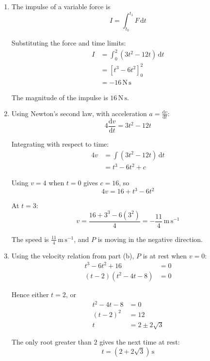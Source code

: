 \documentclass[leqno]{article}
\begin{document}
\begin{enumerate}[
  label=\textbf{\arabic*.},
  leftmargin=*,
  topsep=0pt,
  partopsep=0pt,
  parsep=0pt
]
\vspace*{10pt}

\begin{djsSolution}
\begin{enumerate}[label=\textbf{(\alph*)}, start=1]
\item The impulse of a variable force is
\[
I=\int_{t_0}^{t_1}F\,\mathrm{d}t
\]

Substituting the force and time limits:
\begin{align*}
I&=\int_0^2(3t^2-12t)\,\mathrm{d}t\\
&=\left[t^3-6t^2\right]_0^2\\
&=-16\,\mathrm{N\,s}
\end{align*}

The magnitude of the impulse is \(16\,\mathrm{N\,s}\).

\item Using Newton's second law, with acceleration \(a=\frac{\mathrm{d}v}{\mathrm{d}t}\):
\[
4\frac{\mathrm{d}v}{\mathrm{d}t}=3t^2-12t
\]

Integrating with respect to time:
\begin{align*}
4v&=\int(3t^2-12t)\,\mathrm{d}t\\
&=t^3-6t^2+c
\end{align*}

Using \(v=4\) when \(t=0\) gives \(c=16\), so
\[
4v=16+t^3-6t^2
\]

At \(t=3\):
\[
v=\dfrac{16+3^3-6(3^2)}{4}=-\dfrac{11}{4}\,\mathrm{m\,s^{-1}}
\]

The speed is \(\frac{11}{4}\,\mathrm{m\,s^{-1}}\), and \(P\) is moving in the negative direction.

\item Using the velocity relation from part (b), \(P\) is at rest when \(v=0\):
\begin{align*}
t^3-6t^2+16&=0\\
(t-2)(t^2-4t-8)&=0
\end{align*}

Hence either \(t=2\), or
\begin{align*}
t^2-4t-8&=0\\
(t-2)^2&=12\\
t&=2\pm2\sqrt{3}
\end{align*}

The only root greater than \(2\) gives the next time at rest:
\[
t=\left(2+2\sqrt{3}\right)\,\mathrm{s}
\]

\end{enumerate}
\end{djsSolution}


\end{enumerate}
\end{document}
